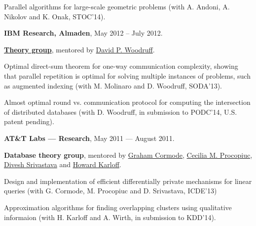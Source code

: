 \documentclass[11pt]{article}
\newenvironment{innerlist}[1][\enskip\textbullet]%
        {\begin{compactitem}[#1]}{\end{compactitem}}
\newcommand{\blankline}{\quad\pagebreak[2]}
\begin{document}
\begin{innerlist}
\item Parallel algorithms for large-scale geometric problems (with A. Andoni, A. Nikolov and K. Onak, STOC'14).
\end{innerlist}

\blankline

\textbf{IBM Research, Almaden},  May 2012 -- July 2012.

\href{http://www.almaden.ibm.com/cs/disciplines/pm/}{\textbf{Theory group}}, mentored by
\href{http://www.almaden.ibm.com/cs/people/dpwoodru/}{David P. Woodruff}. 
\begin{innerlist}
\item Optimal direct-sum theorem for one-way communication complexity, showing that parallel repetition is optimal for solving multiple instances of problems, such as augmented indexing (with M. Molinaro and D. Woodruff, SODA'13). 
\item Almost optimal round vs. communication protocol for computing the intersection of distributed databases (with D. Woodruff, in submission to PODC'14, U.S. patent pending).
\end{innerlist}

\blankline

\textbf{AT\&T Labs --- Research},  May 2011 --- August 2011.

\textbf{Database theory group}, mentored by \href{http://dimacs.rutgers.edu/~graham/}{Graham Cormode}, \href{http://www2.research.att.com/~magda/}{Cecilia M. Procopiuc}, \href{http://www2.research.att.com/~divesh/}{Divesh Srivastava} and \href{http://www.research.att.com/people/Karloff_Howard_J?fbid=MB6sOrb-khf}{Howard Karloff}.
\begin{innerlist}
\item Design and implementation of efficient differentially private mechanisms for linear queries
 (with G. Cormode, M. Procopiuc and D. Srivastava, ICDE'13) %
\item Approximation algorithms for finding overlapping clusters using qualitative informaion (with H. Karloff and A. Wirth, in submission to KDD'14).
\end{innerlist}


\end{document}
